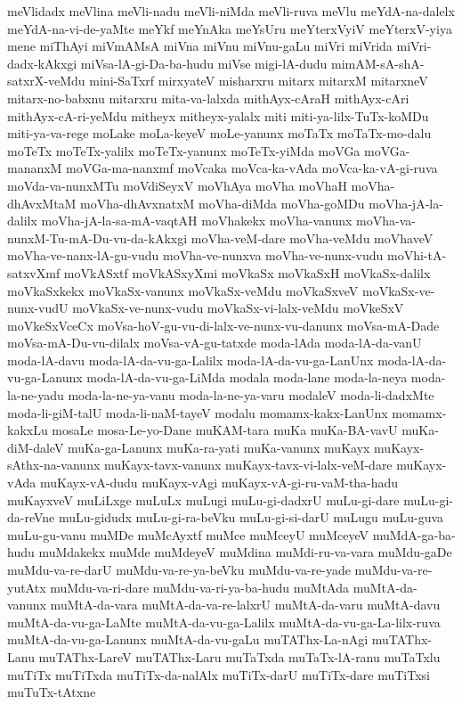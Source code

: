 {meVlidadx
meVlina
meVli-nadu
meVli-niMda
meVli-ruva
meVlu
meYdA-na-dalelx
meYdA-na-vi-de-yaMte
meYkf
meYnAka
meYsUru
meYterxVyiV
meYterxV-yiya
mene
miThAyi
miVmAMsA
miVna
miVnu
miVnu-gaLu
miVri
miVrida
miVri-dadx-kAkxgi
miVsa-lA-gi-Da-ba-hudu
miVse
migi-lA-dudu
mimAM-sA-shA-satxrX-veMdu
mini-SaTxrf
mirxyateV
misharxru
mitarx
mitarxM
mitarxneV
mitarx-no-babxnu
mitarxru
mita-va-lalxda
mithAyx-cAraH
mithAyx-cAri
mithAyx-cA-ri-yeMdu
mitheyx
mitheyx-yalalx
miti
miti-ya-lilx-TuTx-koMDu
miti-ya-va-rege
moLake
moLa-keyeV
moLe-yanunx
moTaTx
moTaTx-mo-dalu
moTeTx
moTeTx-yalilx
moTeTx-yanunx
moTeTx-yiMda
moVGa
moVGa-mananxM
moVGa-ma-nanxmf
moVcaka
moVca-ka-vAda
moVca-ka-vA-gi-ruva
moVda-va-nunxMTu
moVdiSeyxV
moVhAya
moVha
moVhaH
moVha-dhAvxMtaM
moVha-dhAvxnatxM
moVha-diMda
moVha-goMDu
moVha-jA-la-dalilx
moVha-jA-la-sa-mA-vaqtAH
moVhakekx
moVha-vanunx
moVha-va-nunxM-Tu-mA-Du-vu-da-kAkxgi
moVha-veM-dare
moVha-veMdu
moVhaveV
moVha-ve-nanx-lA-gu-vudu
moVha-ve-nunxva
moVha-ve-nunx-vudu
moVhi-tA-satxvXmf
moVkASxtf
moVkASxyXmi
moVkaSx
moVkaSxH
moVkaSx-dalilx
moVkaSxkekx
moVkaSx-vanunx
moVkaSx-veMdu
moVkaSxveV
moVkaSx-ve-nunx-vudU
moVkaSx-ve-nunx-vudu
moVkaSx-vi-lalx-veMdu
moVkeSxV
moVkeSxVceCx
moVsa-hoV-gu-vu-di-lalx-ve-nunx-vu-danunx
moVsa-mA-Dade
moVsa-mA-Du-vu-dilalx
moVsa-vA-gu-tatxde
moda-lAda
moda-lA-da-vanU
moda-lA-davu
moda-lA-da-vu-ga-Lalilx
moda-lA-da-vu-ga-LanUnx
moda-lA-da-vu-ga-Lanunx
moda-lA-da-vu-ga-LiMda
modala
moda-lane
moda-la-neya
moda-la-ne-yadu
moda-la-ne-ya-vanu
moda-la-ne-ya-varu
modaleV
moda-li-dadxMte
moda-li-giM-talU
moda-li-naM-tayeV
modalu
momamx-kakx-LanUnx
momamx-kakxLu
mosaLe
mosa-Le-yo-Dane
muKAM-tara
muKa
muKa-BA-vavU
muKa-diM-daleV
muKa-ga-Lanunx
muKa-ra-yati
muKa-vanunx
muKayx
muKayx-sAthx-na-vanunx
muKayx-tavx-vanunx
muKayx-tavx-vi-lalx-veM-dare
muKayx-vAda
muKayx-vA-dudu
muKayx-vAgi
muKayx-vA-gi-ru-vaM-tha-hadu
muKayxveV
muLiLxge
muLuLx
muLugi
muLu-gi-dadxrU
muLu-gi-dare
muLu-gi-da-reVne
muLu-gidudx
muLu-gi-ra-beVku
muLu-gi-si-darU
muLugu
muLu-guva
muLu-gu-vanu
muMDe
muMcAyxtf
muMce
muMceyU
muMceyeV
muMdA-ga-ba-hudu
muMdakekx
muMde
muMdeyeV
muMdina
muMdi-ru-va-vara
muMdu-gaDe
muMdu-va-re-darU
muMdu-va-re-ya-beVku
muMdu-va-re-yade
muMdu-va-re-yutAtx
muMdu-va-ri-dare
muMdu-va-ri-ya-ba-hudu
muMtAda
muMtA-da-vanunx
muMtA-da-vara
muMtA-da-va-re-lalxrU
muMtA-da-varu
muMtA-davu
muMtA-da-vu-ga-LaMte
muMtA-da-vu-ga-Lalilx
muMtA-da-vu-ga-La-lilx-ruva
muMtA-da-vu-ga-Lanunx
muMtA-da-vu-gaLu
muTAThx-La-nAgi
muTAThx-Lanu
muTAThx-LareV
muTAThx-Laru
muTaTxda
muTaTx-lA-ranu
muTaTxlu
muTiTx
muTiTxda
muTiTx-da-nalAlx
muTiTx-darU
muTiTx-dare
muTiTxsi
muTuTx-tAtxne
}

